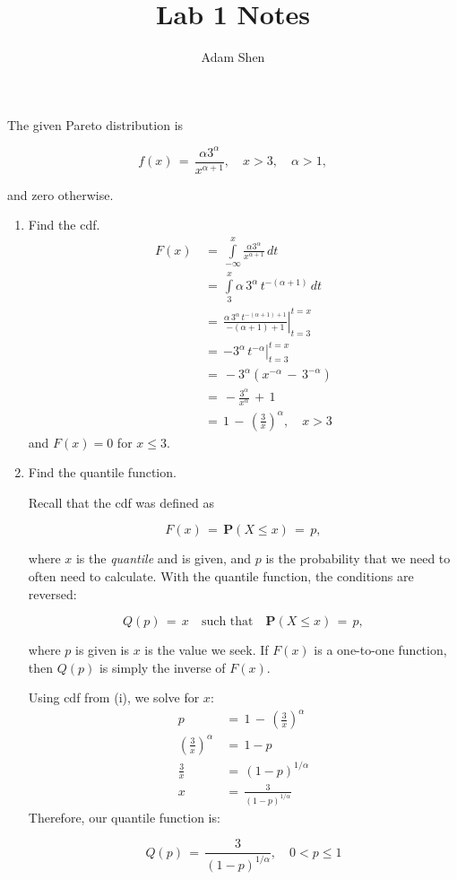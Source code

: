 \documentclass[11pt,letterpaper]{article}
\title{Lab 1 Notes}
\author{Adam Shen}
\date{}
\newcommand{\Prob}[1]{\mathbf{P}\left(#1\right)}
\newcommand{\blue}[1]{{\color{blue}#1}}
\begin{document}
\maketitle

The given Pareto distribution is

\[f(x) \,=\, \frac{\alpha 3^{\alpha}}{x^{\alpha+1}}, \quad x > 3, \quad \alpha > 1,\]

and zero otherwise.

\begin{enumerate}[label=(\roman*)]
\item Find the cdf.
\blue{
\begin{align*}
F(x) \,&=\, \int\limits_{-\infty}^{x}\frac{\alpha 3^{\alpha}}{x^{\alpha+1}}\,dt\\[3mm]
\,&=\, \int\limits_{3}^{x}\alpha\,3^{\alpha}\,t^{-(\alpha + 1)}\,dt\\[3mm]
\,&=\, \left. \frac{\alpha\,3^{\alpha}\,t^{-(\alpha + 1) + 1}}{-(\alpha + 1) + 1} \right|_{t=3}^{t=x}\\[3mm]
\,&=\, \left. -3^{\alpha}\,t^{-\alpha}\right|_{t=3}^{t=x}\\[3mm]
\,&=\, -3^{\alpha}(x^{-\alpha} \,-\, 3^{-\alpha})\\[3mm]
\,&=\, -\frac{3^{\alpha}}{x^{\alpha}} \,+\, 1\\[3mm]
\,&=\, 1 \,-\, \left(\frac{3}{x}\right)^{\alpha}, \quad x > 3
\end{align*}
and $F(x) = 0$ for $x \leq 3$.
}

\item Find the quantile function.

Recall that the cdf was defined as

\[F(x) \,=\, \Prob{X \leq x} \,=\, p,\]

where $x$ is the \emph{quantile} and is given, and $p$ is the probability that we need to often
need to calculate. With the quantile function, the conditions are reversed:

\[Q(p) \,=\, x \quad\text{such that}\quad \Prob{X \leq x} \,=\, p,\]

where $p$ is given is $x$ is the value we seek. If $F(x)$ is a one-to-one function, then $Q(p)$ is
simply the inverse of $F(x)$.

\blue{
Using cdf from (i), we solve for $x$:
\begin{align*}
p \,&=\, 1 \,-\, \left(\frac{3}{x}\right)^{\alpha}\\[3mm]
\left(\frac{3}{x}\right)^{\alpha} \,&=\, 1-p\\[3mm]
\frac{3}{x} \,&=\, (1-p)^{1/\alpha}\\[3mm]
x \,&=\, \frac{3}{(1-p)^{1/\alpha}}
\end{align*}
Therefore, our quantile function is:

\[Q(p) \,=\, \frac{3}{(1-p)^{1/\alpha}}, \quad 0 < p \leq 1\]
}
\end{enumerate}
\end{document}
